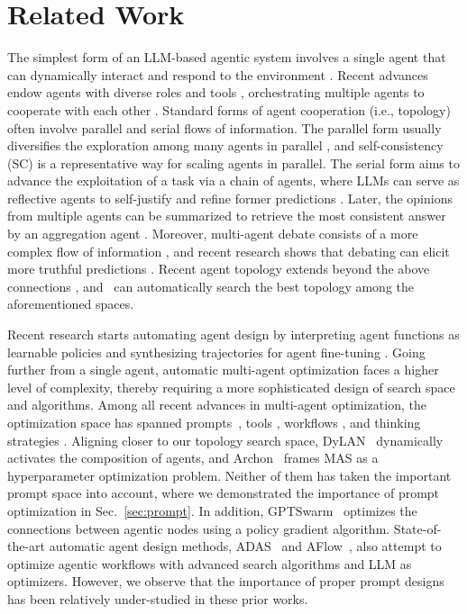 \section{Related Work}
The simplest form of an LLM-based agentic system involves a single agent that can dynamically interact and respond to the environment \citep{yao2023react}. Recent advances endow agents with diverse roles and tools \citep{wu2023autogen}, orchestrating multiple agents to cooperate with each other \citep{chen2024agentverse}.
Standard forms of agent cooperation (i.e., topology) often involve parallel and serial flows of information. The parallel form usually diversifies the exploration among many agents in parallel \citep{li2024more}, and self-consistency (SC) \citep{wang2023selfconsistency} is a representative way for scaling agents in parallel. The serial form aims to advance the exploitation of a task via a chain of agents, where LLMs can serve as reflective agents to self-justify and refine former predictions \citep{madaan2024self, shinn2024reflexion}. Later, the opinions from multiple agents can be summarized to retrieve the most consistent answer by an aggregation agent \citep{chen2024universal, lin-etal-2024-just}. Moreover, multi-agent debate consists of a more complex flow of information \citep{chen-etal-2024-reconcile, wang-etal-2024-rethinking-bounds, zhang-etal-2024-exploring}, and recent research shows that debating can elicit more truthful predictions \citep{khan2024debating, du2024improving}. Recent agent topology extends beyond the above connections \citep{wang2024mixture, qian2024scaling}, and \ours~can automatically search the best topology among the aforementioned spaces. 

Recent research starts automating agent design by interpreting agent functions as learnable policies \citep{zhang2024offline, zhang-etal-2024-agent} and synthesizing trajectories for agent fine-tuning \citep{qiao-etal-2024-autoact}. 
Going further from a single agent, automatic multi-agent optimization faces a higher level of complexity, thereby requiring a more sophisticated design of search space and algorithms. Among all recent advances in multi-agent optimization, the optimization space has spanned prompts~\citep{khattab2024dspy}, tools \citep{zhou2024symbolic}, workflows \citep{li2024autoflow}, and thinking strategies \citep{shang2024agentsquare}. Aligning closer to our topology search space, DyLAN~\citep{liu2024a} dynamically activates the composition of agents, and Archon~\citep{saad2024archon} frames MAS as a hyperparameter optimization problem. Neither of them has taken the important prompt space into account, where we demonstrated the importance of prompt optimization in Sec.~\ref{sec:prompt}. In addition, 
GPTSwarm~\citep{zhuge2024gptswarm} optimizes the connections between agentic nodes using a policy gradient algorithm. 
State-of-the-art automatic agent design methods, ADAS~\citep{hu2024automated} and AFlow~\citep{zhang2024aflow}, also attempt to optimize agentic workflows with advanced search algorithms and LLM as optimizers. However, we observe that the importance of proper prompt designs has been relatively under-studied in these prior works.